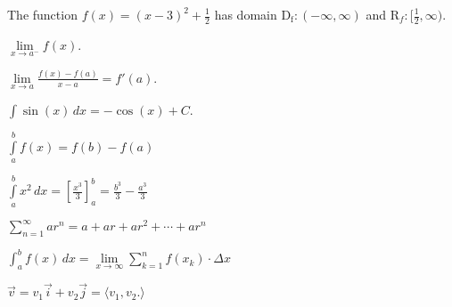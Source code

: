 \documentclass[11pt]{article}
\begin{document}
The function $f(x) = (x-3)^2 + \frac{1}{2} $ has domain $\mathrm{D_f}: (-\infty, \infty)$ and $\mathrm{R}_f:[\frac{1}{2}, \infty)$.

$\lim \limits_{x \to a^-} f(x)$. 

$\displaystyle{\lim \limits_{x \to a} \frac{f(x)-f(a)}{x-a} = f'(a)}$. 

$\displaystyle{\int \sin(x) \, dx = -\cos(x) + C} $.

$\displaystyle{\int \limits_a^b} f(x) = f(b)-f(a) $

$\displaystyle{\int \limits_{a}^{b} x^2 \, dx = \left[\frac{x^3}{3}\right]_{a}^{b} = \frac{b^3}{3} - \frac{a^3}{3} }$ \newline

$\displaystyle{\sum \limits_{n=1}^{\infty}ar^n=a+ar+ar^2+ \cdots +ar^n}$\newline


$\displaystyle{\int_a^b f(x) \, dx = \lim \limits_{x \to \infty} \sum \limits_{k=1}^n} f(x_k)\cdot \Delta x$ \newline

$\displaystyle{\vec{v} = v_1\vec{i} + v_2\vec{j} = \langle v_1, v_2 .\rangle }$
\end{document}
